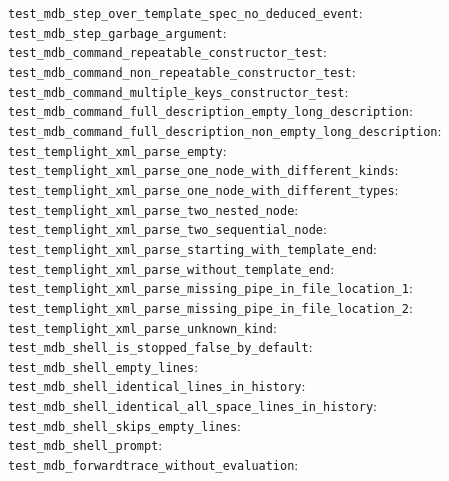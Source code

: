 \begin{description}
    \item[\texttt{test\_mdb\_step\_over\_template\_spec\_no\_deduced\_event}:]
    \item[\texttt{test\_mdb\_step\_garbage\_argument}:]
    \item[\texttt{test\_mdb\_command\_repeatable\_constructor\_test}:]
    \item[\texttt{test\_mdb\_command\_non\_repeatable\_constructor\_test}:]
    \item[\texttt{test\_mdb\_command\_multiple\_keys\_constructor\_test}:]
    \item[\texttt{test\_mdb\_command\_full\_description\_empty\_long\_description}:]
    \item[\texttt{test\_mdb\_command\_full\_description\_non\_empty\_long\_description}:]
    \item[\texttt{test\_templight\_xml\_parse\_empty}:]
    \item[\texttt{test\_templight\_xml\_parse\_one\_node\_with\_different\_kinds}:]
    \item[\texttt{test\_templight\_xml\_parse\_one\_node\_with\_different\_types}:]
    \item[\texttt{test\_templight\_xml\_parse\_two\_nested\_node}:]
    \item[\texttt{test\_templight\_xml\_parse\_two\_sequential\_node}:]
    \item[\texttt{test\_templight\_xml\_parse\_starting\_with\_template\_end}:]
    \item[\texttt{test\_templight\_xml\_parse\_without\_template\_end}:]
    \item[\texttt{test\_templight\_xml\_parse\_missing\_pipe\_in\_file\_location\_1}:]
    \item[\texttt{test\_templight\_xml\_parse\_missing\_pipe\_in\_file\_location\_2}:]
    \item[\texttt{test\_templight\_xml\_parse\_unknown\_kind}:]
    \item[\texttt{test\_mdb\_shell\_is\_stopped\_false\_by\_default}:]
    \item[\texttt{test\_mdb\_shell\_empty\_lines}:]
    \item[\texttt{test\_mdb\_shell\_identical\_lines\_in\_history}:]
    \item[\texttt{test\_mdb\_shell\_identical\_all\_space\_lines\_in\_history}:]
    \item[\texttt{test\_mdb\_shell\_skips\_empty\_lines}:]
    \item[\texttt{test\_mdb\_shell\_prompt}:]
    \item[\texttt{test\_mdb\_forwardtrace\_without\_evaluation}:]

\end{description}
